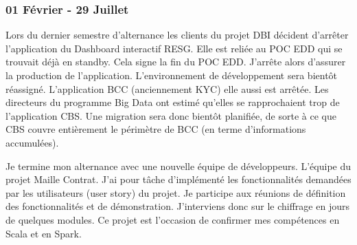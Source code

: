 \subsubsection*{01 Février - 29 Juillet}
\par
Lors du dernier semestre d'alternance les clients du projet DBI décident d'arrêter l'application du Dashboard interactif RESG. Elle est reliée au POC EDD qui se trouvait déjà en standby. Cela signe la fin du POC EDD. J'arrête alors d'assurer la production de l'application. L’environnement de développement sera bientôt réassigné. L’application BCC (anciennement KYC) elle aussi est arrêtée. Les directeurs du programme Big Data ont estimé qu’elles se rapprochaient trop de l’application CBS. Une migration sera donc bientôt planifiée, de sorte à ce que CBS couvre entièrement le périmètre de BCC (en terme d’informations accumulées).
\par
Je termine mon alternance avec une nouvelle équipe de développeurs. L’équipe du projet Maille Contrat. J’ai pour tâche d’implémenté les fonctionnalités demandées par les utilisateurs (user story) du projet. Je participe aux réunions de définition des fonctionnalités et de démonstration. J’interviens donc sur le chiffrage en jours de quelques modules. Ce projet est l’occasion de confirmer mes compétences en Scala et en Spark.
